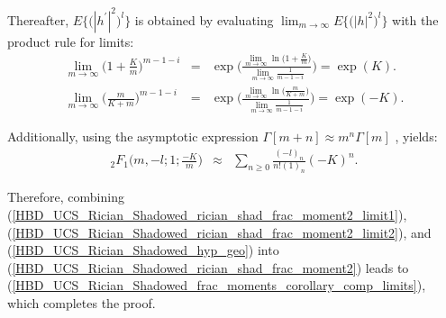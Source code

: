 Thereafter, $E\big\{\big(|h^{'}|^2\big)^l\big\}$ is obtained by evaluating $\lim_{m\to\infty} E\big\{\big(|h|^2\big)^l\big\}$ with the product rule for limits:
\begin{eqnarray} 
\lim_{m \to \infty} \bigg(1+\frac{K}{m}\bigg)^{m-1-i} & = & \exp\Bigg(\frac{\lim_{m\to\infty}\ln\big(1+\frac{K}{m}\big)}{\lim_{m\to\infty}\frac{1}{m-1-i}}\Bigg) = \exp(K). \label{HBD_UCS_Rician_Shadowed_rician_shad_frac_moment2_limit1} \\
\lim_{m \to \infty} \bigg(\frac{m}{K+m}\bigg)^{m-1-i} & = & \exp\Bigg(\frac{\lim_{m\to\infty}\ln\big(\frac{m}{K+m}\big)}{\lim_{m\to\infty}\frac{1}{m-1-i}}\Bigg) = \exp(-K). \label{HBD_UCS_Rician_Shadowed_rician_shad_frac_moment2_limit2}
\end{eqnarray}

Additionally, using the asymptotic expression $\Gamma[m+n] \approx m^n\Gamma[m]$ \cite[eq. (25)]{rached2017unified}, yields:
\begin{eqnarray} \label{HBD_UCS_Rician_Shadowed_hyp_geo}
{}_2F_1\bigg(m,-l;1;\frac{-K}{m}\bigg) & \approx & \sum_{n\geq0} \frac{(-l)_n}{n!(1)_n}(-K)^n.
\end{eqnarray}

Therefore, combining (\ref{HBD_UCS_Rician_Shadowed_rician_shad_frac_moment2_limit1}), (\ref{HBD_UCS_Rician_Shadowed_rician_shad_frac_moment2_limit2}), and (\ref{HBD_UCS_Rician_Shadowed_hyp_geo}) into (\ref{HBD_UCS_Rician_Shadowed_rician_shad_frac_moment2}) leads to (\ref{HBD_UCS_Rician_Shadowed_frac_moments_corollary_comp_limits}), which completes the proof.

